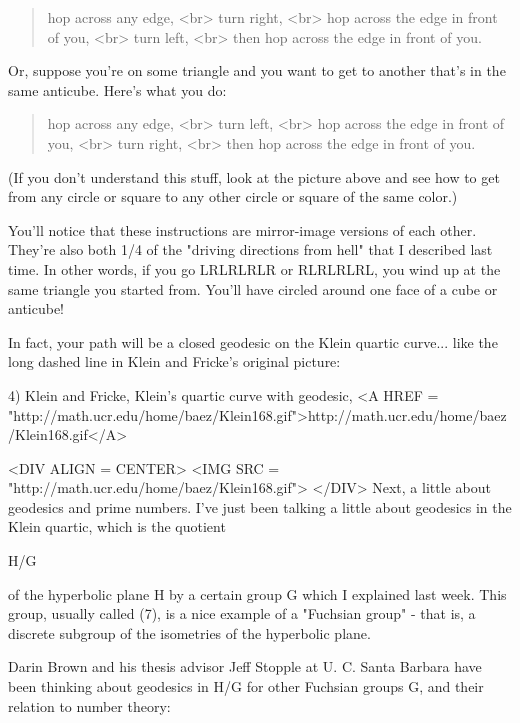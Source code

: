 \begin{quote}
hop across any edge, <br>
turn right, <br>
hop across the edge in front of you, <br>
turn left, <br>
then hop across the edge in front of you.  

\end{quote}
    
Or, suppose you're on some triangle and you want to get to another
that's in the same anticube.  Here's what you do:

\begin{quote}
hop across any edge, <br>
turn left, <br>
hop across the edge in front of you, <br>
turn right, <br>
then hop across the edge in front of you.  
 
\end{quote}
    
(If you don't understand this stuff, look at the picture above and 
see how to get from any circle or square to any other circle or 
square of the same color.) 

You'll notice that these instructions are mirror-image versions of 
each other.  They're also both 1/4 of the "driving directions from 
hell" that I described last time.  In other words, if you go 
LRLRLRLR or RLRLRLRL, you wind up at the same triangle you started
from.  You'll have circled around one face of a cube or anticube!

In fact, your path will be a closed geodesic on the Klein quartic 
curve... like the long dashed line in Klein and Fricke's original 
picture:

4) Klein and Fricke, Klein's quartic curve with geodesic,
<A HREF = "http://math.ucr.edu/home/baez/Klein168.gif">http://math.ucr.edu/home/baez/Klein168.gif</A>

<DIV ALIGN = CENTER>
<IMG SRC = "http://math.ucr.edu/home/baez/Klein168.gif">
</DIV>
Next, a little about geodesics and prime numbers.   I've just been
talking a little about geodesics in the Klein quartic, which is the
quotient 

H/G

of the hyperbolic plane H by a certain group G which I explained  
last week.  This group, usually called \Gamma (7), is a nice example 
of a "Fuchsian group" - that is, a discrete subgroup of the isometries
of the hyperbolic plane.  

Darin Brown and his thesis advisor Jeff Stopple at U. C. Santa
Barbara have been thinking about geodesics in H/G for other Fuchsian
groups G, and their relation to number theory:

